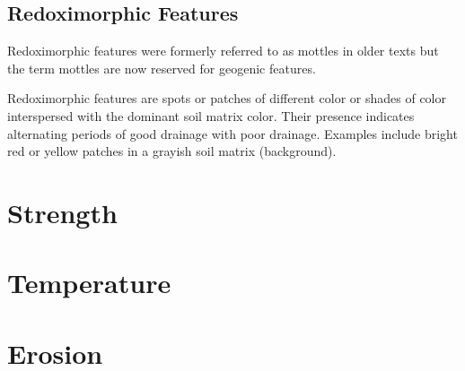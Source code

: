 \documentclass[a5paper]{report}
\begin{document}
\subsection{Redoximorphic Features}
    
Redoximorphic features were formerly referred to as mottles in older texts but the term mottles are now reserved for geogenic features.
    
Redoximorphic features are spots or patches of different color or shades of color interspersed with the dominant soil matrix color. Their presence indicates alternating periods of good drainage with poor drainage. Examples include bright red or yellow patches in a grayish soil matrix (background).

\section{Strength}
\label{strength}


\section{Temperature}
\label{temperature}


\section{Erosion}
\label{erosion}

\end{document}
